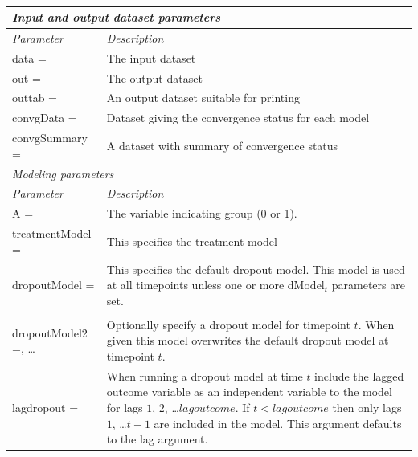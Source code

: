 \documentclass[10pt]{article}
\begin{document}
{\ \ \hspace{0.0in}}
\begin{minipage}[t]{6.2in}
\begin{flushleft}
\small
\renewcommand{\arraystretch}{1.2}
\begin{spacing}{1.1}
\begin{tabular}[l]{|p{1.3in}|p{4.6in}|}
   \multicolumn{2}{l}{\normalsize\em Input and output dataset parameters\rule[0.0in]{0.0in}{0.0in}} \\\hline
   {\normalsize\em\em Parameter }& 
   {\normalsize\em\em Description}
\\\hline
   data =            &  The input dataset  
\\\hline
   out =             &  The output dataset
\\\hline
   outtab =          &  An output dataset suitable for printing
\\\hline
   convgData =       &  Dataset giving the convergence status for each model
\\\hline
   convgSummary =    &  A dataset with summary of convergence status 
\\\hline
   \multicolumn{2}{l}{\normalsize\em Modeling parameters \rule[0.0in]{0.0in}{0.3in}} \\\hline
   {\normalsize\em\em Parameter }& 
   {\normalsize\em\em Description}
\\\hline
   A =               &  The variable indicating group (0 or 1).  
\\\hline
   treatmentModel =  &  This specifies the treatment model
\\\hline
   dropoutModel =    &  This specifies the default dropout model.  This model is used at all timepoints unless one or more dModel$_t$ parameters are set.
\\\hline
   \begin{minipage}[t]{1.3in}
   dropoutModel1 =,\\
   dropoutModel2 =, \ldots    
   \end{minipage}    &  Optionally specify a dropout model for timepoint $t$.  When given this model overwrites the default dropout model at timepoint $t$. 
\\\hline
   lagdropout =      &  When running a dropout model at time $t$ include the lagged outcome variable as an independent variable to the model for lags $1$, $2$, \ldots $lagoutcome$.  If $t < lagoutcome$ then only lags $1$, \ldots $t-1$ are included in the model.  This argument defaults to the lag argument.
\\\hline

\end{tabular}
\end{spacing}
\end{flushleft}
\end{minipage}
\end{document}
